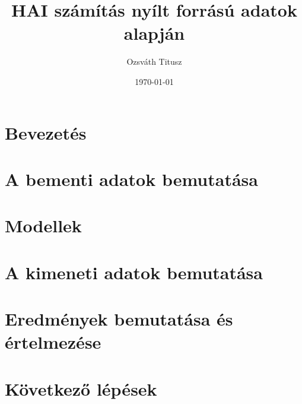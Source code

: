 \documentclass[a4paper,12pt]{report}
\title{HAI számítás nyílt forrású adatok alapján}
\author{Ozsváth Titusz}
\date{\today}
\begin{document}
\maketitle
\tableofcontents
\newpage

\chapter{Bevezetés}


\chapter{A bementi adatok bemutatása}


\chapter{Modellek}


\chapter{A kimeneti adatok bemutatása}


\chapter{Eredmények bemutatása és értelmezése}


\chapter{Következő lépések}

\end{document}

